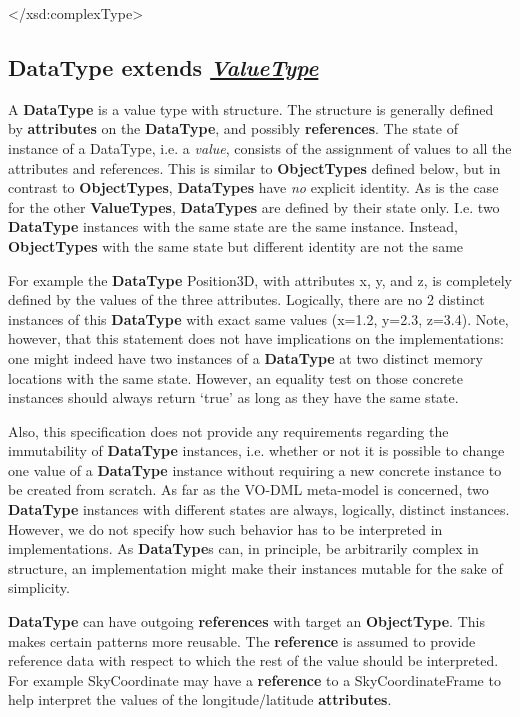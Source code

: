 \documentclass[10pt,a4paper]{ivoa}
\begin{document}
\textless/xsd:complexType\textgreater{}

\hypertarget{datatype-extends-valuetype}{%
\subsection{\texorpdfstring{DataType extends
\protect\hyperlink{valuetype-extends-type}{\emph{ValueType}}}{DataType extends ValueType}}\label{datatype-extends-valuetype}}

A \textbf{DataType} is a value type with structure. The structure is
generally defined by \textbf{attributes} on the \textbf{DataType}, and
possibly \textbf{references}. The state of instance of a DataType, i.e.
a \emph{value}, consists of the assignment of values to all the
attributes and references. This is similar to \textbf{ObjectTypes}
defined below, but in contrast to \textbf{ObjectTypes},
\textbf{DataTypes} have \emph{no} explicit identity. As is the case for
the other \textbf{ValueTypes}, \textbf{DataTypes} are defined by their
state only. I.e. two \textbf{DataType} instances with the same state are
the same instance. Instead, \textbf{ObjectTypes} with the same state but
different identity are not the same

For example the \textbf{DataType} Position3D, with attributes x, y, and
z, is completely defined by the values of the three attributes.
Logically, there are no 2 distinct instances of this \textbf{DataType}
with exact same values (x=1.2, y=2.3, z=3.4). Note, however, that this
statement does not have implications on the implementations: one might
indeed have two instances of a \textbf{DataType} at two distinct memory
locations with the same state. However, an equality test on those
concrete instances should always return `true' as long as they have the
same state.

Also, this specification does not provide any requirements regarding the
immutability of \textbf{DataType} instances, i.e. whether or not it is
possible to change one value of a \textbf{DataType} instance without
requiring a new concrete instance to be created from scratch. As far as
the VO-DML meta-model is concerned, two \textbf{DataType} instances with
different states are always, logically, distinct instances. However, we
do not specify how such behavior has to be interpreted in
implementations. As \textbf{DataType}s can, in principle, be arbitrarily
complex in structure, an implementation might make their instances
mutable for the sake of simplicity.

\textbf{DataType} can have outgoing \textbf{references} with target an
\textbf{ObjectType}. This makes certain patterns more reusable. The
\textbf{reference} is assumed to provide reference data with respect to
which the rest of the value should be interpreted. For example
SkyCoordinate may have a \textbf{reference} to a SkyCoordinateFrame to
help interpret the values of the longitude/latitude \textbf{attributes}.
\end{document}
